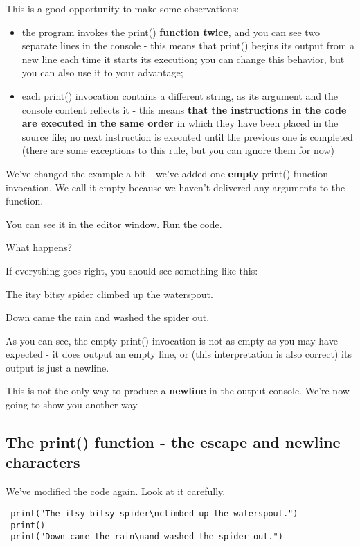\documentclass[a4paper,10pt]{article}
\begin{document}
This is a good opportunity to make some observations:
\begin{itemize}
 \item the program invokes the {\selectfont print()} \textbf{function twice}, and you can see two separate lines in the console - this means that {\selectfont print()} begins its output from a new line each time it starts its execution; you can change this behavior, but you can also use it to your advantage;
 \item each {\selectfont print()} invocation contains a different string, as its argument and the console content reflects it - this means \textbf{that the instructions in the code are executed in the same order} in which they have been placed in the source file; no next instruction is executed until the previous one is completed (there are some exceptions to this rule, but you can ignore them for now)
\end{itemize}


We've changed the example a bit - we've added one \textbf{empty} {\selectfont print()} function invocation. We call it empty because we haven't delivered any arguments to the function.
\newline

You can see it in the editor window. Run the code.
\newline

What happens?
\newline

If everything goes right, you should see something like this:
\newline

{\selectfont The itsy bitsy spider climbed up the waterspout.
\newline

Down came the rain and washed the spider out.}
\newline

As you can see, the empty {\selectfont print()} invocation is not as empty as you may have expected - it does output an empty line, or (this interpretation is also correct) its output is just a newline.
\newline

This is not the only way to produce a \textbf{newline} in the output console. We're now going to show you another way.

\subsection{The print() function - the escape and newline characters}
We've modified the code again. Look at it carefully.
\begin{verbatim}
 print("The itsy bitsy spider\nclimbed up the waterspout.")
 print()
 print("Down came the rain\nand washed the spider out.")
\end{verbatim}
\end{document}
